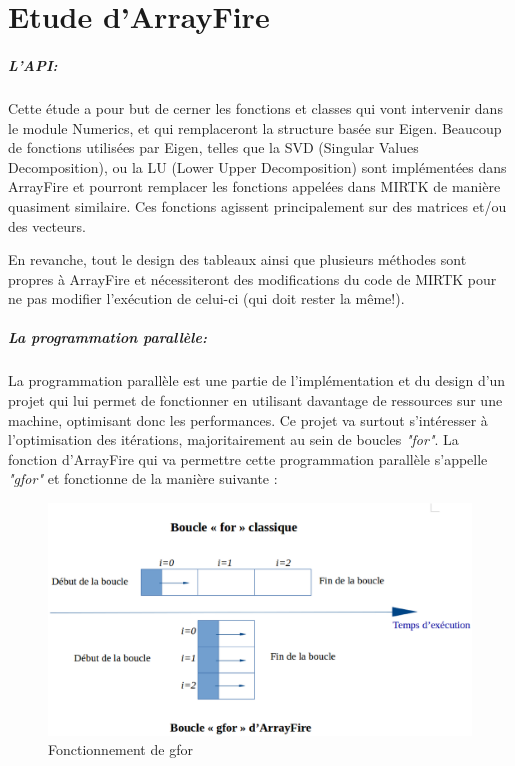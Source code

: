 \documentclass{report}
\begin{document}
\chapter*{Etude d'ArrayFire}

\paragraph{L'API:}
Cette étude a pour but de cerner les fonctions et classes qui vont intervenir dans le module Numerics, et qui remplaceront la structure basée sur Eigen. Beaucoup de fonctions utilisées par Eigen, telles que la SVD (Singular Values Decomposition), ou la LU (Lower Upper Decomposition) sont implémentées dans ArrayFire et pourront remplacer les fonctions appelées dans MIRTK de manière quasiment similaire. Ces fonctions agissent principalement sur des matrices et/ou des vecteurs.

En revanche, tout le design des tableaux ainsi que plusieurs méthodes sont propres à ArrayFire et nécessiteront des modifications du code de MIRTK pour ne pas modifier l'exécution de celui-ci (qui doit rester la même!).

\paragraph{La programmation parallèle:}
La programmation parallèle est une partie de l'implémentation et du design d'un projet qui lui permet de fonctionner en utilisant davantage de ressources sur une machine, optimisant donc les performances. Ce projet va surtout s'intéresser à l'optimisation des itérations, majoritairement au sein de boucles \textit{"for"}.
La fonction d'ArrayFire qui va permettre cette programmation parallèle s'appelle \textit{"gfor"} et fonctionne de la manière suivante :

\begin{figure}[h!]
	\begin{center}
		\includegraphics[width=14cm]{figures/gfor.eps}
	\end{center}	
	\caption{Fonctionnement de gfor}
	\label{Fonctionnement de gfor}
\end{figure}
\end{document}
